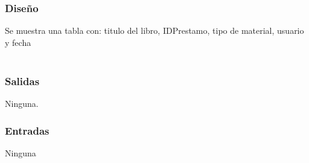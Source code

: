 \subsubsection{Diseño}
	Se muestra una tabla con: titulo del libro, IDPrestamo, tipo de material, usuario y fecha  \\\\


\subsubsection{Salidas}
	\begin{Citemize}
		\item Ninguna. 
	\end{Citemize}
	
\subsubsection{Entradas}
	\begin{Citemize}
		\item Ninguna
	\end{Citemize}